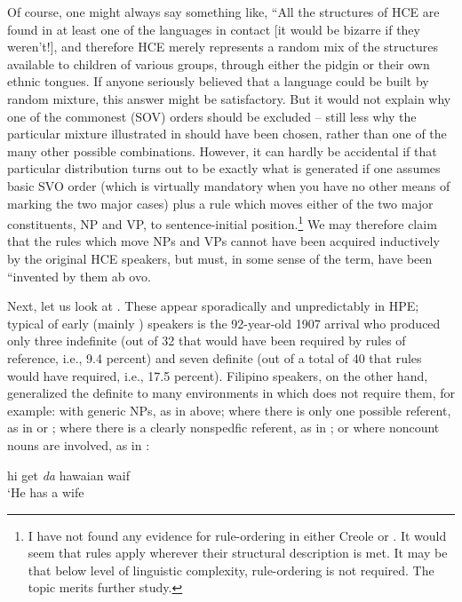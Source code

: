Of course, one might always say something like, ``All the struc\-tures of HCE are found in at least one of the languages in contact [it would be bizarre if they weren't!], and therefore HCE merely repre\-sents a random mix of the structures available to children of various groups, through either the pidgin or their own ethnic tongues. If anyone seriously believed that a language could be built by random mixture, this answer might be satisfactory. But it would not explain why one of the commonest (SOV) orders should be excluded -- still less why the particular mixture illustrated in  should have been chosen, rather than one of the many other possible combinations. However, it can hardly be accidental if that particular distribution turns out to be exactly what is generated if one assumes basic SVO order (which is virtually mandatory when you have no other means of mark\-ing the two major cases) plus a rule which moves either of the two
major constituents, NP and VP, to sentence-initial position.\footnote{I have not found any evidence for rule-ordering in either Creole  or . It would seem that rules apply wherever their structural description is met. It may be that below level of linguistic complexity, rule-ordering is not required. The topic merits further study.} We may therefore claim that the rules which move NPs and VPs cannot have been acquired inductively by the original HCE speakers, but must, in some sense of the term, have been ``invented by them ab ovo.

Next, let us look at . These appear sporadically and unpredictably in HPE; typical of early (mainly ) speakers is the 92-year-old 1907 arrival who produced only three indefinite  (out of 32 that would have been required by  rules of reference, i.e., 9.4 percent) and seven definite  (out of a total of 40 that  rules would have required, i.e., 17.5 percent). Filipino speakers, on the other hand, generalized the definite  to many environ\-ments in which  does not require them, for example: with generic NPs, as in  above; where there is only one possible refer\-ent, as in  or ; where there is a clearly nonspedfic referent, as in ; or where noncount nouns are involved, as in :

\ea\label{ex:30}
 hi get \textit{da} hawaian waif \\
\glt  `He has a  wife
\z

